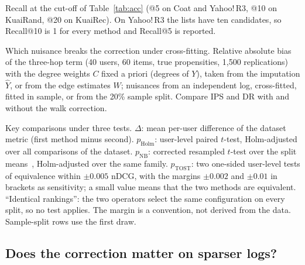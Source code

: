 \begin{table}[p]\centering\scriptsize
\caption{Recall at the cut-off of Table~\ref{tab:acc} (@5 on Coat and Yahoo!\,R3, @10 on KuaiRand, @20 on KuaiRec). On Yahoo!\,R3 the lists have ten candidates, so Recall@10 is 1 for every method and Recall@5 is reported.}\label{tab:recall}
\begin{adjustbox}{max width=\textwidth}

\end{adjustbox}
\end{table}

\begin{table}[t]\centering\small
\caption{Which nuisance breaks the correction under cross-fitting. Relative absolute bias of the three-hop term
(40 users, 60 items, true propensities, 1{,}500 replications) with the degree weights $C$ fixed a priori
(degrees of $Y$), taken from the imputation $\hat Y$, or from the edge estimates $W$; nuisances from an
independent log, cross-fitted, fitted in sample, or from the 20\% sample split. Compare IPS and DR with
and without the walk correction.}\label{tab:protocolfixed}
\begin{adjustbox}{max width=\textwidth}

\end{adjustbox}
\end{table}

\begin{table}[t]\centering\scriptsize
\caption{Key comparisons under three tests. $\Delta$: mean per-user difference of the dataset metric (first method minus second).
$p_{\mathrm{Holm}}$: user-level paired $t$-test, Holm-adjusted over all comparisons of the dataset.
$p_{\mathrm{NB}}$: corrected resampled $t$-test over the split means~\cite{nadeau2003}, Holm-adjusted over the same family. $p_{\mathrm{TOST}}$: two
one-sided user-level tests of equivalence within $\pm0.005$ nDCG, with the margins $\pm0.002$ and $\pm0.01$ in brackets as sensitivity; a small value means that
the two methods are equivalent. ``Identical rankings'': the two operators select the same configuration on every split, so no test applies. The margin is a convention, not derived from the data. Sample-split rows use the first draw.}\label{tab:nbtost}
\begin{adjustbox}{max width=\textwidth}

\end{adjustbox}
\end{table}

\subsection{Does the correction matter on sparser logs?}\label{sec:sparse}

